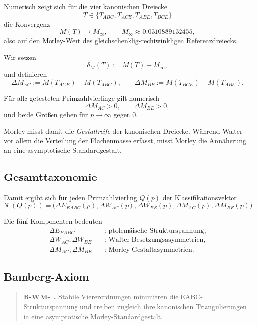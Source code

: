 Numerisch zeigt sich für die vier kanonischen Dreiecke
\[
T\in\{T_{ABC},T_{ACE},T_{ABE},T_{BCE}\}
\]
die Konvergenz
\[
M(T)\longrightarrow M_\infty,
\qquad
M_\infty\approx 0.0310889132455,
\]
also auf den Morley-Wert des gleichschenklig-rechtwinkligen Referenzdreiecks.

\begin{definition}
Wir setzen
\[
\delta_M(T):=M(T)-M_\infty,
\]
und definieren
\[
\Delta M_{AC}:=M(T_{ACE})-M(T_{ABC}),
\qquad
\Delta M_{BE}:=M(T_{BCE})-M(T_{ABE}).
\]
\end{definition}

\begin{proposition}
Für alle getesteten Primzahlvierlinge gilt numerisch
\[
\Delta M_{AC}>0,
\qquad
\Delta M_{BE}>0,
\]
und beide Größen gehen für $p\to\infty$ gegen $0$.
\end{proposition}

Morley misst damit die \emph{Gestaltreife} der kanonischen Dreiecke. Während Walter vor allem die Verteilung der Flächenmasse erfasst, misst Morley die Annäherung an eine asymptotische Standardgestalt.

\subsection{Gesamttaxonomie}

Damit ergibt sich für jeden Primzahlvierling $Q(p)$ der Klassifikationsvektor
\[
\mathcal K(Q(p))
=
\bigl(
\Delta E_{EABC}(p),
\Delta W_{AC}(p),
\Delta W_{BE}(p),
\Delta M_{AC}(p),
\Delta M_{BE}(p)
\bigr).
\]

Die fünf Komponenten bedeuten:
\begin{align*}
\Delta E_{EABC}&\quad\text{: ptolemäische Strukturspannung},\\
\Delta W_{AC},\Delta W_{BE}&\quad\text{: Walter-Besetzungsasymmetrien},\\
\Delta M_{AC},\Delta M_{BE}&\quad\text{: Morley-Gestaltasymmetrien}.
\end{align*}

\subsection{Bamberg-Axiom}

\begin{quote}
\textbf{B-WM-1.} Stabile Viererordnungen minimieren die EABC-Strukturspannung und treiben zugleich ihre kanonischen Triangulierungen in eine asymptotische Morley-Standardgestalt.
\end{quote}

